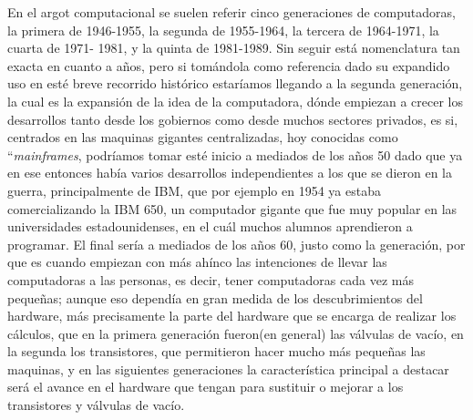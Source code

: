 \documentclass[letterpaper,12pt,oneside]{book}
\begin{document}
		En el argot computacional se suelen referir cinco generaciones de computadoras, la primera de 1946-1955, la segunda de 1955-1964, la tercera de 1964-1971,
		la cuarta de 1971- 1981, y la quinta de 1981-1989. Sin seguir está nomenclatura tan exacta en cuanto a años, pero si tomándola como referencia dado
		su expandido uso en esté breve recorrido histórico estaríamos llegando a la segunda generación, la cual es la expansión de la idea de la computadora,
		dónde empiezan a crecer los desarrollos tanto desde los gobiernos como desde muchos sectores privados, es si, centrados en las maquinas gigantes centralizadas,
		hoy conocidas como ``\textit{mainframes}, podríamos tomar esté inicio a mediados de los años 50 dado que ya en ese entonces había varios desarrollos independientes
		a los que se dieron en la guerra, principalmente de IBM, que por ejemplo en 1954 ya estaba comercializando la IBM 650, un computador gigante que fue
		muy popular en las universidades estadounidenses, en el cuál muchos alumnos aprendieron a programar. El final sería a mediados de los años 60, justo como
		la generación, por que es cuando empiezan con más ahínco las intenciones de llevar las computadoras a las personas, es decir, tener computadoras cada
		vez más pequeñas; aunque eso dependía en gran medida de los descubrimientos del hardware, más precisamente la parte del hardware que se encarga de realizar
		los cálculos, que en la primera generación fueron(en general) las válvulas de vacío, en la segunda los transistores, que permitieron hacer mucho
		más pequeñas las maquinas, y en las siguientes generaciones la característica principal a destacar será el avance en el hardware que tengan para sustituir
		o mejorar a los transistores y válvulas de vacío.
		
\end{document}
